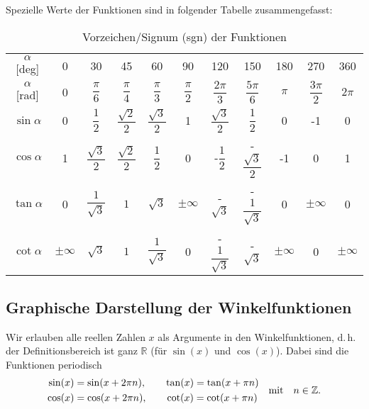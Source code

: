 Spezielle Werte der Funktionen sind in folgender Tabelle zusammengefasst: 
\begin{table}[htp]
    \centering
    \caption{Vorzeichen/Signum (sgn) der Funktionen}
    \begin{tabular}{c c c c c c c c c c c }
        \toprule 
         $\alpha$ [deg] & 0 & 30 & 45 & 60 & 90 & 120 & 150 & 180 & 270 & 360 \\
         $\alpha$ [rad] & 0 & $\dfrac{\pi}{6}$ & $\dfrac{\pi}{4}$ & $\dfrac{\pi}{3}$ & $\dfrac{\pi}{2}$ & $\dfrac{2\pi}{3}$ & $\dfrac{5\pi}{6}$ & $\pi$ & $\dfrac{3\pi}{2}$ & $2\pi$\\[.4em]
         \midrule 
         $\sin\alpha$   & 0 & $\dfrac{1}{2}$ & $\dfrac{\sqrt{2}}{2}$ & $\dfrac{\sqrt{3}}{2}$ & 1 & $\dfrac{\sqrt{3}}{2}$ & $\dfrac{1}{2}$ & 0 & -1 & 0 \\[.7em]
         $\cos\alpha$   & 1 & $\dfrac{\sqrt{3}}{2}$ & $\dfrac{\sqrt{2}}{2}$ & $\dfrac{1}{2}$ & 0 & -$\dfrac{1}{2}$ & -$\dfrac{\sqrt{3}}{2}$ & -1 & 0 & 1 \\[.7em]
         $\tan\alpha$   & 0 & $\dfrac{1}{\sqrt{3}}$ & $1$ & $\sqrt{3}$ & $\pm \infty$ & -$\sqrt{3}$ & -$\dfrac{1}{\sqrt{3}}$ & 0 & $\pm \infty$ & 0 \\[.7em]
         $\cot\alpha$   & $\pm\infty$ & $\sqrt{3}$ & $1$ & $\dfrac{1}{\sqrt{3}}$ & 0 & -$\dfrac{1}{\sqrt{3}}$ & -$\sqrt{3}$ & $\pm \infty$ & 0 & $\pm \infty$ \\

    \end{tabular}
    \vspace{-1cm}
\end{table}

\subsection{Graphische Darstellung der Winkelfunktionen}

Wir erlauben alle reellen Zahlen $x$ als Argumente in den Winkelfunktionen, d.\,h. der Definitionsbereich ist ganz $\mathbb{R}$ (für $\sin(x)$ und $\cos(x)$). Dabei sind die Funktionen periodisch 
\begin{align}
    \begin{split}
        \sin(x) &= \sin(x+2\pi n), \qquad \tan(x) = \tan(x+\pi n) \\
        \cos(x) &= \cos(x+2\pi n), \qquad \cot(x) = \cot(x+\pi n)
    \end{split} \qq{mit} n \in \mathbb{Z}.
\end{align}

